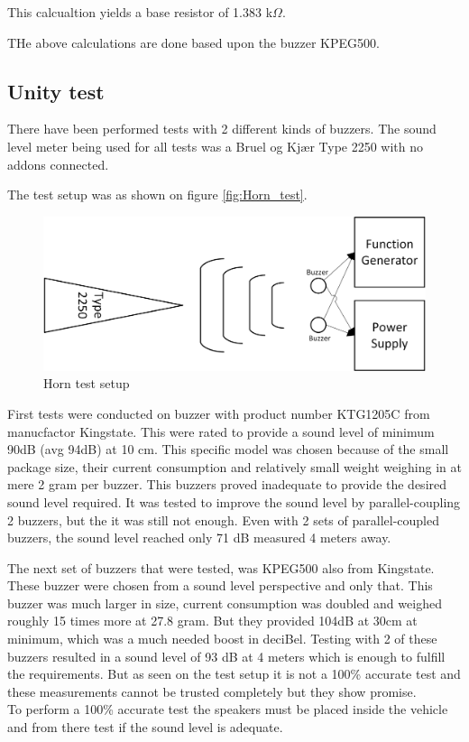 This calcualtion yields a base resistor of 1.383 k$\Omega$.

THe above calculations are done based upon the buzzer KPEG500.

\subsection{Unity test}
There have been performed tests with 2 different kinds of buzzers. The sound level meter being used for all tests was a Bruel og Kjær Type 2250  with no addons connected.

The test setup was as shown on figure \vref{fig:Horn_test}. 

\begin{figure}[H]
	\centering
	\includegraphics[width=0.7\linewidth]{Hardware/Pictures/Horn_test}
	\caption{Horn test setup}
	\label{fig:Horn_test}
\end{figure}

First tests were conducted on buzzer with product number KTG1205C from manucfactor Kingstate. This were rated to provide a sound level of minimum 90dB (avg 94dB) at 10 cm. This specific model was chosen because of the small package size, their current consumption and relatively small weight weighing in at mere 2 gram per buzzer. This buzzers proved inadequate to provide the desired sound level required. It was tested to improve the sound level by parallel-coupling 2 buzzers, but the it was still not enough. Even with 2 sets of parallel-coupled buzzers, the sound level reached only 71 dB measured 4 meters away.

The next set of buzzers that were tested, was KPEG500 also from Kingstate. These buzzer were chosen from a sound level perspective and only that. This buzzer was much larger in size, current consumption was doubled and weighed roughly 15 times more at 27.8 gram. But they provided 104dB at 30cm at minimum, which was a much needed boost in deciBel. Testing with 2 of these buzzers resulted in a sound  level of 93 dB at 4 meters which is enough to fulfill the requirements. But as seen on the test setup it is not a 100\% accurate test and these measurements cannot be trusted completely but they show promise. \\
To perform a 100\% accurate test the speakers must be placed inside the vehicle and from there test if the sound level is adequate.


